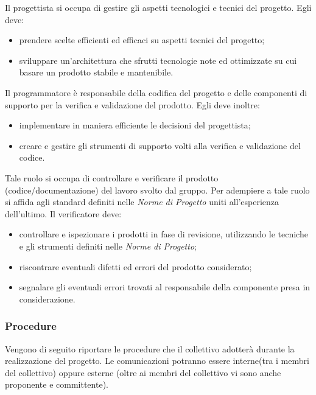 			Il progettista si occupa di gestire gli aspetti tecnologici e tecnici del progetto.
			Egli deve:
			\begin{itemize}
				\item prendere scelte efficienti ed efficaci su aspetti tecnici del progetto;
				\item sviluppare un'architettura che sfrutti tecnologie note ed ottimizzate su cui basare un prodotto stabile e mantenibile.
			\end{itemize}
		
			Il programmatore è responsabile della codifica del progetto e delle componenti di supporto per la verifica e validazione del prodotto. Egli deve inoltre: 
			\begin{itemize}
				\item implementare in maniera efficiente le decisioni del progettista;
				\item creare e gestire gli strumenti di supporto volti alla verifica e validazione del codice.
			\end{itemize}
		
			Tale ruolo si occupa di controllare e verificare il prodotto (codice/documentazione) del lavoro svolto dal gruppo. Per adempiere a tale ruolo si affida agli standard definiti nelle \textit{Norme di Progetto} uniti all'esperienza dell'ultimo. Il verificatore deve:
			\begin{itemize}
				\item controllare e ispezionare i prodotti in fase di revisione, utilizzando le tecniche e gli strumenti definiti nelle \textit{Norme di Progetto};
				\item riscontrare eventuali difetti ed errori del prodotto considerato;
				\item segnalare gli eventuali errori trovati al responsabile della componente presa in considerazione.
			\end{itemize}
		
		
		\subsubsection{Procedure}
		Vengono di seguito riportare le procedure che il collettivo adotterà durante la realizzazione del progetto. Le comunicazioni potranno essere interne(tra i membri del collettivo) oppure esterne (oltre ai membri del collettivo vi sono anche proponente e committente).
		
			
